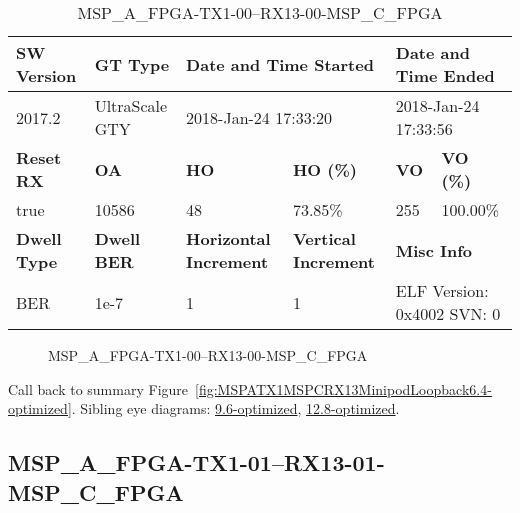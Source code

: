 \begin{table}[h]
\centering
\caption{MSP\_A\_FPGA-TX1-00--RX13-00-MSP\_C\_FPGA}
\label{tab:MSPAFPGATX100RX1300MSPCFPGA6.4-optimized}
\begin{tabular}{@{}|l|l|l|l|l|l|@{}}
\toprule
\textbf{SW Version}                & \textbf{GT Type}   & \multicolumn{2}{l|}{\textbf{Date and Time Started}}            & \multicolumn{2}{l|}{\textbf{Date and Time Ended}}        \\ \midrule
2017.2                       & UltraScale GTY          & \multicolumn{2}{l|}{2018-Jan-24 17:33:20}                   & \multicolumn{2}{l|}{2018-Jan-24 17:33:56}               \\ \midrule
\textbf{Reset RX}                  & \textbf{OA} & \textbf{HO}   & \textbf{HO (\%)} & \textbf{VO} & \textbf{VO (\%)} \\ \midrule
true & 10586        & 48          & 73.85\%        & 255        & 100.00\%       \\ \midrule
\textbf{Dwell Type}                & \textbf{Dwell BER} & \textbf{Horizontal Increment} & \textbf{Vertical Increment}    & \multicolumn{2}{l|}{\textbf{Misc Info}}                  \\ \midrule
BER                            & 1e-7        & 1        & 1           & \multicolumn{2}{l|}{ELF Version: 0x4002 SVN: 0}                         \\ \bottomrule
\end{tabular}
\end{table}

\begin{figure}[h]
\caption{MSP\_A\_FPGA-TX1-00--RX13-00-MSP\_C\_FPGA} \label{fig:MSPAFPGATX100RX1300MSPCFPGA6.4-optimized}
\end{figure}

Call back to summary Figure~\ref{fig:MSPATX1MSPCRX13MinipodLoopback6.4-optimized}.
Sibling eye diagrams: \hyperref[sec:MSPAFPGATX100RX1300MSPCFPGA9.6-optimized]{9.6-optimized}, \hyperref[sec:MSPAFPGATX100RX1300MSPCFPGA12.8-optimized]{12.8-optimized}.

\clearpage
\newpage


\subsection{MSP\_A\_FPGA-TX1-01--RX13-01-MSP\_C\_FPGA}\label{sec:MSPAFPGATX101RX1301MSPCFPGA6.4-optimized}

